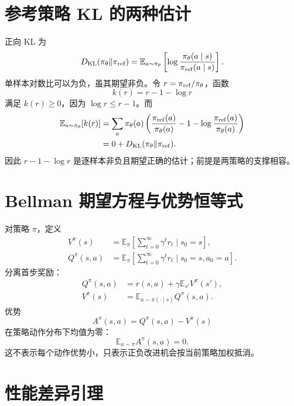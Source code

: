 \documentclass[11pt]{article}
\numberwithin{equation}{section}
\newcommand{\E}{\mathbb{E}}
\newcommand{\1}{\mathbf{1}}
\begin{document}
\section{参考策略 KL 的两种估计}

正向 KL 为
\begin{equation}
 D_{\rm KL}(\pi_\theta\|\pi_{\rm ref})
 =\E_{a\sim\pi_\theta}
 \left[\log\frac{\pi_\theta(a\mid s)}{\pi_{\rm ref}(a\mid s)}\right].
\end{equation}
单样本对数比可以为负，虽其期望非负。令
$r=\pi_{\rm ref}/\pi_\theta$，函数
\begin{equation}
 k(r)=r-1-\log r
\end{equation}
满足 $k(r)\ge0$，因为 $\log r\le r-1$。而
\begin{align}
 \E_{a\sim\pi_\theta}[k(r)]
 &=\sum_a\pi_\theta(a)
 \left(\frac{\pi_{\rm ref}(a)}{\pi_\theta(a)}-1
 -\log\frac{\pi_{\rm ref}(a)}{\pi_\theta(a)}\right)\\
 &=0+D_{\rm KL}(\pi_\theta\|\pi_{\rm ref}).
\end{align}
因此 $r-1-\log r$ 是逐样本非负且期望正确的估计；前提是两策略的支撑相容。

\section{Bellman 期望方程与优势恒等式}

对策略 $\pi$，定义
\begin{align}
 V^\pi(s)&=\E_\pi\left[\sum_{t=0}^{\infty}\gamma^tr_t\mid s_0=s\right],\\
 Q^\pi(s,a)&=\E_\pi\left[\sum_{t=0}^{\infty}\gamma^tr_t
 \mid s_0=s,a_0=a\right].
\end{align}
分离首步奖励：
\begin{align}
 Q^\pi(s,a)&=r(s,a)+\gamma\E_{s'}V^\pi(s'),\\
 V^\pi(s)&=\E_{a\sim\pi(\cdot\mid s)}Q^\pi(s,a).
\end{align}
优势
\begin{equation}
 A^\pi(s,a)=Q^\pi(s,a)-V^\pi(s)
\end{equation}
在策略动作分布下均值为零：
\begin{equation}
 \E_{a\sim\pi}A^\pi(s,a)=0.
\end{equation}
这不表示每个动作优势小，只表示正负改进机会按当前策略加权抵消。

\section{性能差异引理}
\end{document}
